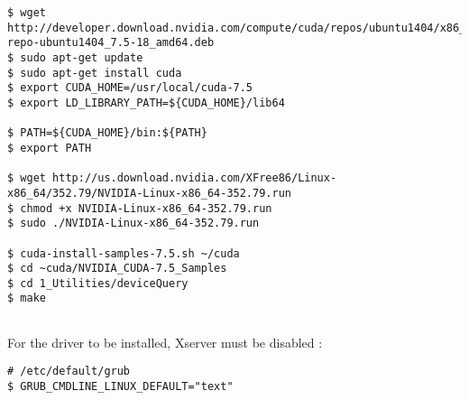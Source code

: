 \begin{lstlisting}
$ wget http://developer.download.nvidia.com/compute/cuda/repos/ubuntu1404/x86_64/cuda-repo-ubuntu1404_7.5-18_amd64.deb
$ sudo apt-get update
$ sudo apt-get install cuda
$ export CUDA_HOME=/usr/local/cuda-7.5 
$ export LD_LIBRARY_PATH=${CUDA_HOME}/lib64 
 
$ PATH=${CUDA_HOME}/bin:${PATH} 
$ export PATH
	
$ wget http://us.download.nvidia.com/XFree86/Linux-x86_64/352.79/NVIDIA-Linux-x86_64-352.79.run
$ chmod +x NVIDIA-Linux-x86_64-352.79.run
$ sudo ./NVIDIA-Linux-x86_64-352.79.run
	
$ cuda-install-samples-7.5.sh ~/cuda
$ cd ~cuda/NVIDIA_CUDA-7.5_Samples 
$ cd 1_Utilities/deviceQuery 
$ make
	
\end{lstlisting}

For the driver to be installed, Xserver must be disabled :

\begin{lstlisting}
# /etc/default/grub
$ GRUB_CMDLINE_LINUX_DEFAULT="text"
\end{lstlisting}